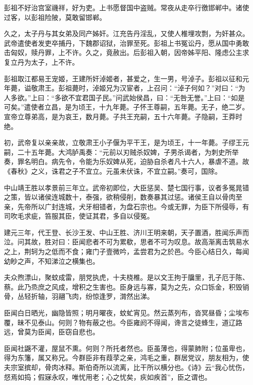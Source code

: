 \documentclass[12pt,UTF8]{ctexbook}
\begin{document}
彭祖不好治宫室禨祥，好为吏。上书愿督国中盗贼。常夜从走卒行徼邯郸中。诸使过客，以彭祖险陂，莫敢留邯郸。



久之，太子丹与其女弟及同产姊奸。江充告丹淫乱，又使人椎埋攻剽，为奸甚众。武帝遣使者发吏卒捕丹，下魏郡诏狱，治罪至死。彭祖上书冤讼丹，愿从国中勇敢击匈奴，赎丹罪，上不许。久之，竟赦出。后彭祖入朝，因帝姊平阳、隆虑公主求复立丹为太子，上不许。



彭祖取江都易王宠姬，王建所奸淖姬者，甚爱之，生一男，号淖子。彭祖以征和元年薨，谥敬肃王。彭祖薨时，淖姬兄为汉宦者，上召问：“淖子何如？”对曰：“为人多欲。”上曰：“多欲不宜君国子民。”问武始侯昌，曰：“无咎无誉。”上曰：“如是可矣。”遣使者立昌，是为顷王，十九年薨。子怀王尊嗣，五年薨。无子，绝二岁。宣帝立尊弟高，是为哀王，数月薨。子共王充嗣，五十六年薨。子隐嗣，王莽时绝。



初，武帝复以亲亲故，立敬肃王小子偃为平干王，是为顷王，十一年薨。子缪王元嗣，二十五年薨。大鸿胪禹奏：“元前以刃贼杀奴婢，子男杀谒者，为刺史所举奏，罪名明白。病先令，令能为乐奴婢从死，迫胁自杀者凡十六人，暴虐不道。故《春秋》之义，诛君之子不宜立。元虽未伏诛，不宜立嗣。”奏可，国除。



中山靖王胜以孝景前三年立。武帝初即位，大臣惩吴、楚七国行事，议者多冤晁错之策，皆以诸侯连城数十，泰强，欲稍侵削，数奏暴其过惩。诸侯王自以骨肉至亲，先帝所以广封连城，犬牙相错者，为盘石宗也。今或无罪，为臣下所侵辱，有司吹毛求疵，笞服其臣，使证其君，多自以侵冤。



建元三年，代王登、长沙王发、中山王胜、济川王明来朝，天子置酒，胜闻乐声而泣。问其故，胜对曰：臣闻悲者不可为累欷，思者不可为叹息。故高渐离击筑易水之上，荆轲为之低而不食；雍门子壹微吟，孟尝君为之於邑。今臣心结日久，每闻幼眇之声，不知涕泣之横集也。



夫众煦漂山，聚蚊成雷，朋党执虎，十夫桡椎。是以文王拘于牖里，孔子厄于陈、蔡。此乃烝庶之风成，增积之生害也。臣身远与寡，莫为之先，众口铄金，积毁销骨，丛轻折轴，羽翮飞肉，纷惊逢罗，潸然出涕。



臣闻白日晒光，幽隐皆照；明月曜夜，蚊虻宵见。然云蒸列布，沓冥昼昏；尘埃布覆，昧不见泰山。何则？物有蔽之也。今臣雍阏不得闻，谗言之徒蜂生，道辽路远，曾莫为臣闻，臣窃自悲也。



臣闻社鼷不灌，屋鼠不熏。何则？所托者然也。臣虽薄也，得蒙肺附；位虽卑也，得为东籓，属又称兄。今群臣非有葭莩之亲，鸿毛之重，群居党议，朋友相为，使夫宗室摈却，骨肉冰释。斯伯奇所以流离，比干所以横分也。《诗》云“我心忧伤，惄焉如捣；假寐永叹，唯忧用老；心之忧矣，疢如疾首”，臣之谓也。
\end{document}
